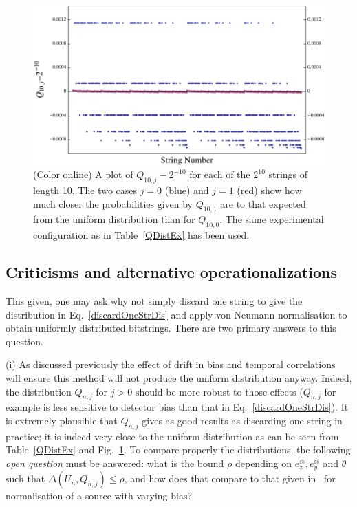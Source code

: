 \documentclass{mscs}
\begin{document}
\begin{figure}[ht]
\begin{center}
\includegraphics[scale=0.9]{2010-qxor-SpreadFromUD}
\end{center}
\caption{(Color online) A plot of $Q_{10,j}-2^{-10}$ for each of the $2^{10}$ strings of length 10. The two cases $j=0$ (blue) and $j=1$ (red) show how much closer the probabilities given by $Q_{10,1}$ are to that expected from the uniform distribution than for $Q_{10,0}$. The same experimental configuration as in Table~\ref{QDistEx} has been used.}
\label{VarFromUD}
\end{figure}

\subsection{Criticisms and alternative operationalizations}\label{sec:crits}

This given, one may ask why not simply discard one string to give the distribution in Eq.~\eqref{discardOneStrDis} and apply von Neumann normalisation to obtain uniformly distributed bitstrings. There are two primary answers to this question.

(i) As discussed previously the effect of drift in bias and temporal correlations will ensure this method will not produce the uniform distribution anyway. Indeed, the distribution $Q_{n,j}$ for $j>0$ should be more robust to those effects ($Q_{n,j}$ for example is less sensitive to detector bias than that in Eq.~\eqref{discardOneStrDis}). It is extremely plausible that $Q_{n,j}$ gives as good results as discarding one string in practice; it is indeed very close to the uniform distribution as can be seen from Table~\ref{QDistEx} and Fig.~\ref{VarFromUD}. To compare properly the distributions, the following \emph{open question} must be answered: what is the bound $\rho$ depending on $e_x^\oplus,e_y^\otimes$ and $\theta$ such that $\Delta(U_n,Q_{n,j})\le \rho$, and how does that compare to that given in~\citep{AbbottCalude10} for normalisation of a source with varying bias?
\end{document}
